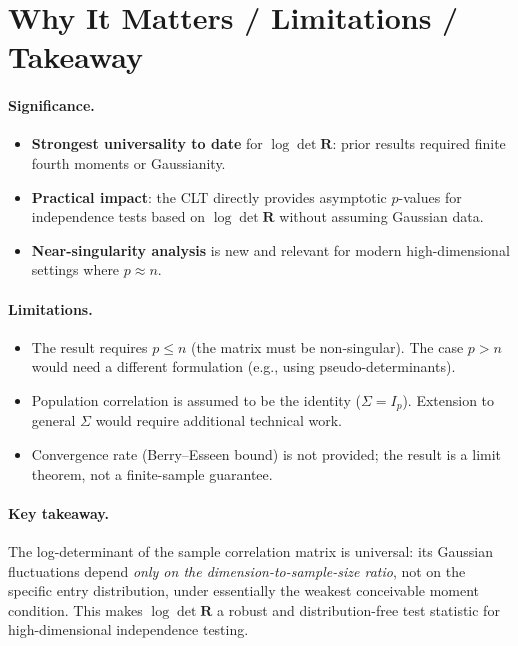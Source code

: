 \documentclass[11pt,a4paper]{article}
\begin{document}
\section{Why It Matters / Limitations / Takeaway}

\paragraph{Significance.}
\begin{itemize}[nosep]
  \item \textbf{Strongest universality to date} for $\log\det\mathbf{R}$: prior results required finite fourth moments or Gaussianity.
  \item \textbf{Practical impact}: the CLT directly provides asymptotic $p$-values for independence tests based on $\log\det\mathbf{R}$ without assuming Gaussian data.
  \item \textbf{Near-singularity analysis} is new and relevant for modern high-dimensional settings where $p\approx n$.
\end{itemize}

\paragraph{Limitations.}
\begin{itemize}[nosep]
  \item The result requires $p \le n$ (the matrix must be non-singular).  The case $p > n$ would need a different formulation (e.g., using pseudo-determinants).
  \item Population correlation is assumed to be the identity ($\Sigma = I_p$).  Extension to general $\Sigma$ would require additional technical work.
  \item Convergence rate (Berry--Esseen bound) is not provided; the result is a limit theorem, not a finite-sample guarantee.
\end{itemize}

\paragraph{Key takeaway.}
The log-determinant of the sample correlation matrix is universal: its Gaussian fluctuations depend \emph{only on the dimension-to-sample-size ratio}, not on the specific entry distribution, under essentially the weakest conceivable moment condition.  This makes $\log\det\mathbf{R}$ a robust and distribution-free test statistic for high-dimensional independence testing.
\end{document}
